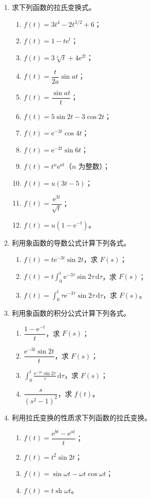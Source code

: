 \documentclass[UTF8,11pt,a4paper]{ctexart}
\newcommand{\dd}{\,\mathrm{d}}
\newcommand{\ee}{\mathrm{e}}
\newcommand{\sh}{\operatorname{sh}}
\begin{document}
\begin{enumerate}
\item 求下列函数的拉氏变换式。
  \begin{enumerate}
  \item $f(t)=3t^4-2t^{3/2}+6$；
  \item $f(t)=1-t\ee^t$；
  \item $f(t)=3\sqrt[3]t+4\ee^{2t}$；
  \item $f(t)=\dfrac t{2a}\sin at$；
  \item $f(t)=\dfrac{\sin at}{t}$；
  \item $f(t)=5\sin2t-3\cos2t$；
  \item $f(t)=\ee^{-3t}\cos4t$；
  \item $f(t)=\ee^{-2t}\sin6t$；
  \item $f(t)=t^n\ee^{at}$（$n$ 为整数）；
  \item $f(t)=u(3t-5)$；
  \item $f(t)=\dfrac{\ee^{3t}}{\sqrt t}$；
  \item $f(t)=u(1-\ee^{-t})$。
  \end{enumerate}

\item 利用象函数的导数公式计算下列各式。
  \begin{enumerate}
  \item $f(t)=t\ee^{-3t}\sin2t$，求 $F(s)$；
  \item $\displaystyle f(t)=t\int_0^t\ee^{-3\tau}\sin2\tau\dd\tau$，求 $F(s)$；
  \item $\displaystyle f(t)=\int_0^t\tau\ee^{-3\tau}\sin2\tau\dd\tau$，求 $F(s)$。
  \end{enumerate}

\item 利用象函数的积分公式计算下列各式。
  \begin{enumerate}
  \item $\dfrac{1-\ee^{-t}}t$，求 $F(s)$；
  \item $\dfrac{\ee^{-3t}\sin2t}{t}$，求 $F(s)$；
  \item $\displaystyle\int_0^t\frac{\ee^{-3\tau}\sin2\tau}{\tau}\dd\tau$，求 $F(s)$；
  \item $\dfrac{s}{(s^2-1)^2}$，求 $f(t)$。
  \end{enumerate}

\item 利用拉氏变换的性质求下列函数的拉氏变换。
  \begin{enumerate}
  \item $f(t)=\dfrac{\ee^{bt}-\ee^{at}}t$；
  \item $f(t)=t^2\sin2t$；
  \item $f(t)=\sin\omega t-\omega t\cos\omega t$；
  \item $f(t)=t\sh\omega t$。
  \end{enumerate}


\end{enumerate}
\end{document}
